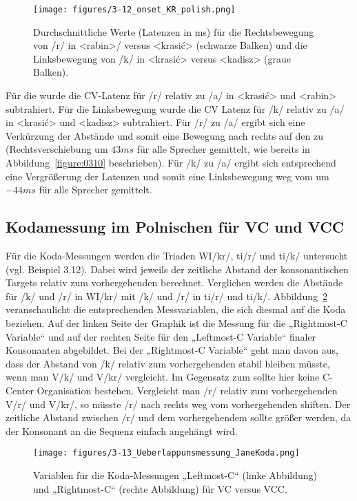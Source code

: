 {\begin{figure}
	\texttt{[image: figures/3-12\_onset\_KR\_polish.png]}
	\caption{Durchschnittliche Werte (Latenzen in ms) für die Rechtsbewegung von /r/ in <rabin>/ versus <krasić> (schwarze Balken) und die Linksbewegung von /k/ in <krasić> versus <kadisz> (graue Balken).}
	\label{figure:0312}
\end{figure}

Für die  wurde die CV-Latenz für /r/ relativ zu /a/ in <krasić> und <rabin> subtrahiert. Für die Linksbewegung wurde die CV Latenz für /k/ relativ zu /a/ in <krasić> und <kadisz> subtrahiert. Für /r/ zu /a/ ergibt sich eine Verkürzung der Abstände und somit eine Bewegung nach rechts auf den  zu (Rechtsverschiebung um $43{ms}$ für alle Sprecher gemittelt, wie bereits in Abbildung~\ref{figure:0310} beschrieben). Für /k/ zu /a/ ergibt sich entsprechend eine Vergrößerung der Latenzen und somit eine Linksbewegung weg vom  um $-44{ms}$ für alle Sprecher gemittelt.


\subsection{Kodamessung im  {Polnisch}en für VC und VCC}
\label{subsec:030402}

Für die Koda-Messungen werden die Triaden WI/kr/, ti/r/ und ti/k/ untersucht (vgl. Beispiel 3.12). Dabei wird jeweils der zeitliche Abstand der konsonantischen Targets relativ zum vorhergehenden  berechnet. Verglichen werden die Abstände für /k/ und /r/ in WI/kr/ mit /k/ und /r/ in ti/r/ und ti/k/. Abbildung~\ref{figure:0313} veranschaulicht die entsprechenden Messvariablen, die sich diesmal auf die Koda beziehen. Auf der linken Seite der Graphik ist die Messung für die „Rightmost-C Variable“ und auf der rechten Seite für den „Leftmost-C Variable“ finaler Konsonanten abgebildet. Bei der „Rightmost-C Variable“ geht man davon aus, dass der Abstand von /k/ relativ zum vorhergehenden  stabil bleiben müsste, wenn man V/k/ und V/kr/ vergleicht. Im Gegensatz zum  sollte hier keine C-Center Organisation bestehen. Vergleicht man /r/ relativ zum vorhergehenden  V/r/ und V/kr/, so müsste /r/ nach rechts weg vom vorhergehenden  shiften. Der zeitliche Abstand zwischen /r/ und dem vorhergehendem  sollte größer werden, da der Konsonant an die Sequenz einfach angehängt wird. 

\begin{figure}
	\texttt{[image: figures/3-13\_Ueberlappunsmessung\_JaneKoda.png]}
	\caption{Variablen für die Koda-Messungen „Leftmost-C“ (linke Abbildung) und „Rightmost-C“ (rechte Abbildung) für VC versus VCC.}
	\label{figure:0313}
\end{figure}

}
